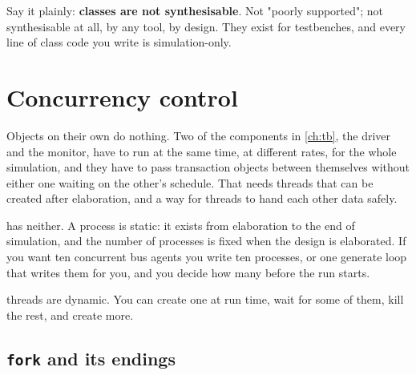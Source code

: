 Say it plainly: \textbf{classes are not synthesisable}. Not "poorly
supported"; not synthesisable at all, by any tool, by design. They exist for
testbenches, and every line of class code you write is simulation-only.

\section{Concurrency control}
\label{sec:beyond:fork}
\label{sec:toolkit:fork}

Objects on their own do nothing. Two of the components in \cref{ch:tb}, the
driver and the monitor, have to run at the same time, at different rates, for
the whole simulation, and they have to pass transaction objects between
themselves without either one waiting on the other's schedule. That needs
threads that can be created after elaboration, and a way for threads to hand
each other data safely.

\VHDL{} has neither. A \VHDL{} process is static: it exists from elaboration
to the end of simulation, and the number of processes is fixed when the design
is elaborated. If you want ten concurrent bus agents you write ten processes,
or one generate loop that writes them for you, and you decide how many before
the run starts.

\SV{} threads are dynamic. You can create one at run time, wait for some of
them, kill the rest, and create more.

\subsection{\texttt{fork} and its endings}


